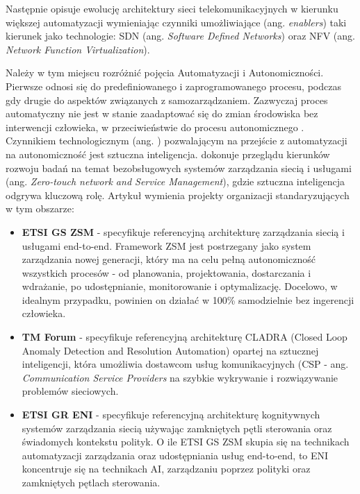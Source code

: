 Następnie \cite{doyle2014} opisuje ewolucję architektury sieci telekomunikacyjnych w kierunku większej automatyzacji wymieniając czynniki umożliwiające (ang. \textit{enablers}) taki kierunek jako technologie: SDN (ang. \textit{Software Defined Networks}) oraz NFV (ang. \textit{Network Function Virtualization}).

Należy w tym miejscu rozróżnić pojęcia Automatyzacji i Autonomiczności. Pierwsze odnosi się do predefiniowanego i zaprogramowanego procesu, podczas gdy drugie do aspektów związanych z samozarządzaniem. Zazwyczaj proces automatyczny nie jest w stanie zaadaptować się do zmian środowiska bez interwencji człowieka, w przeciwieństwie do procesu autonomicznego \cite{ngmn2022}. Czynnikiem technologicznym (ang. ) pozwalającym na przejście z automatyzacji na autonomiczność jest sztuczna inteligencja. \cite{benzaid2020} dokonuje przeglądu kierunków rozwoju badań na temat bezobsługowych systemów zarządzania siecią i usługami (ang. \textit{Zero-touch network and Service Management}), gdzie sztuczna inteligencja odgrywa kluczową rolę. Artykuł wymienia projekty organizacji standaryzujących w tym obszarze:
\begin{itemize}
    \item \textbf{ETSI GS ZSM} - specyfikuje referencyjną architekturę zarządzania siecią i usługami end-to-end. Framework ZSM jest postrzegany jako system zarządzania nowej generacji, który ma na celu pełną autonomiczność wszystkich procesów - od planowania, projektowania, dostarczania i wdrażanie, po udostępnianie, monitorowanie i optymalizację. Docelowo, w idealnym przypadku, powinien on działać w 100\% samodzielnie bez ingerencji człowieka. 
    \item \textbf{TM Forum} - specyfikuje referencyjną architekturę CLADRA (Closed Loop Anomaly Detection and Resolution Automation) opartej na sztucznej inteligencji, która umożliwia dostawcom usług komunikacyjnych (CSP - ang. \textit{Communication Service Providers} na szybkie wykrywanie i rozwiązywanie problemów sieciowych.
    \item \textbf{ETSI GR ENI} - specyfikuje referencyjną architekturę kognitywnych systemów zarządzania siecią używając zamkniętych pętli sterowania oraz świadomych kontekstu polityk. O ile ETSI GS ZSM skupia się na technikach automatyzacji zarządzania oraz udostępniania usług end-to-end, to ENI koncentruje się na technikach AI, zarządzaniu poprzez polityki oraz zamkniętych pętlach sterowania.
\end{itemize}

